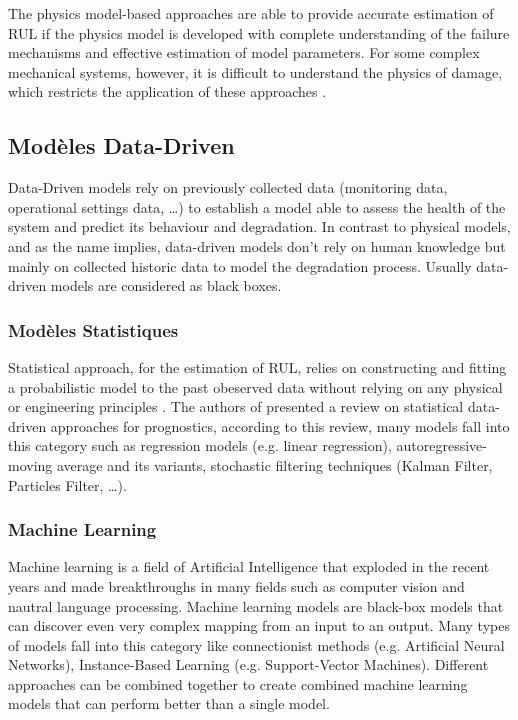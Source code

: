 The physics model-based approaches are able to provide accurate estimation of RUL if the physics model is developed with complete understanding of the failure mechanisms and effective estimation of model parameters. For some complex mechanical systems, however, it is difficult to understand the physics of damage, which restricts the application of these approaches \cite{Lei2018}.

\subsection{Modèles Data-Driven}
Data-Driven models rely on previously collected data (monitoring data, operational settings data, …) to establish a model able to assess the health of the system and predict its behaviour and degradation.
In contrast to physical models, and as the name implies, data-driven models don't rely on human knowledge but mainly on collected historic data to model the degradation process. Usually data-driven models are considered as black boxes.

\subsubsection{Modèles Statistiques}
Statistical approach, for the estimation of RUL, relies on constructing and fitting a probabilistic model to the past obeserved data without relying on any physical or engineering principles \cite{Si2011}. 
The authors of \cite{Si2011} presented a review on statistical data-driven approaches for prognostics, according to this review, many models fall into this category such as regression models (e.g. linear regression), autoregressive-moving average and its variants, stochastic filtering techniques (Kalman Filter, Particles Filter, …).

\subsubsection{Machine Learning}
Machine learning is a field of Artificial Intelligence that exploded in the recent years and made breakthroughs in many fields such as computer vision and nautral language processing. Machine learning models are black-box models that can discover even very complex mapping from an input to an output. Many types of models fall into this category like connectionist methods (e.g. Artificial Neural Networks), Instance-Based Learning (e.g. Support-Vector Machines). Different approaches can be combined together to create combined machine learning models that can perform better than a single model.

